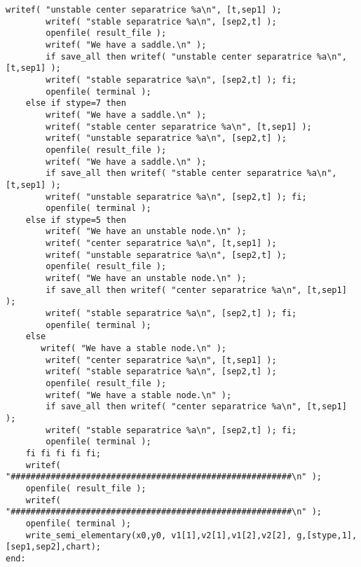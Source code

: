 \documentclass[a4paper,10pt]{article}
\begin{document}
\begin{lstlisting}[name=type]
        writef( "unstable center separatrice %a\n", [t,sep1] );
        writef( "stable separatrice %a\n", [sep2,t] );
        openfile( result_file );
        writef( "We have a saddle.\n" );
        if save_all then writef( "unstable center separatrice %a\n", [t,sep1] );
        writef( "stable separatrice %a\n", [sep2,t] ); fi;
        openfile( terminal );
    else if stype=7 then
        writef( "We have a saddle.\n" );
        writef( "stable center separatrice %a\n", [t,sep1] );
        writef( "unstable separatrice %a\n", [sep2,t] );
        openfile( result_file );
        writef( "We have a saddle.\n" );
        if save_all then writef( "stable center separatrice %a\n", [t,sep1] );
        writef( "unstable separatrice %a\n", [sep2,t] ); fi;
        openfile( terminal );
    else if stype=5 then
        writef( "We have an unstable node.\n" );
        writef( "center separatrice %a\n", [t,sep1] );
        writef( "unstable separatrice %a\n", [sep2,t] );
        openfile( result_file );
        writef( "We have an unstable node.\n" );
        if save_all then writef( "center separatrice %a\n", [t,sep1] );
        writef( "stable separatrice %a\n", [sep2,t] ); fi;
        openfile( terminal );
    else
       writef( "We have a stable node.\n" );
        writef( "center separatrice %a\n", [t,sep1] );
        writef( "stable separatrice %a\n", [sep2,t] );
        openfile( result_file );
        writef( "We have a stable node.\n" );
        if save_all then writef( "center separatrice %a\n", [t,sep1] );
        writef( "stable separatrice %a\n", [sep2,t] ); fi;
        openfile( terminal );
    fi fi fi fi fi;
    writef( "########################################################\n" );
    openfile( result_file );
    writef( "########################################################\n" );
    openfile( terminal );
    write_semi_elementary(x0,y0, v1[1],v2[1],v1[2],v2[2], g,[stype,1],[sep1,sep2],chart);
end:
\end{lstlisting}
\end{document}
